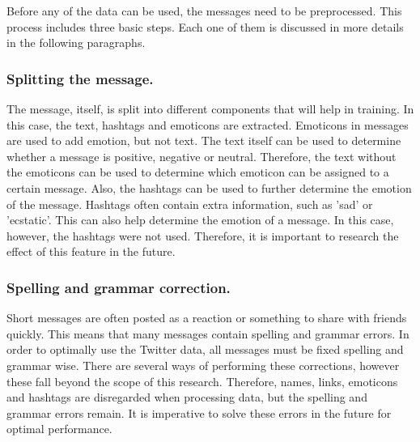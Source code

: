 
Before any of the data can be used, the messages need to be preprocessed. This process includes three basic steps. Each one of them is discussed in more details in the following paragraphs.

\subsubsection*{Splitting the message.}
The message, itself, is split into different components that will help in training. In this case, the text, hashtags and emoticons are extracted. Emoticons in messages are used to add emotion, but not text. The text itself can be used to determine whether a message is positive, negative or neutral. Therefore, the text without the emoticons can be used to determine which emoticon can be assigned to a certain message. Also, the hashtags can be used to further determine the emotion of the message. Hashtags often contain extra information, such as 'sad' or 'ecstatic'. This can also help determine the emotion of a message. In this case, however, the hashtags were not used. Therefore, it is important to research the effect of this feature in the future. 

\subsubsection*{Spelling and grammar correction.}
Short messages are often posted as a reaction or something to share with friends quickly. This means that many messages contain spelling and grammar errors. In order to optimally use the Twitter data, all messages must be fixed spelling and grammar wise. There are several ways of performing these corrections, however these fall beyond the scope of this research. Therefore, names, links, emoticons and hashtags are disregarded when processing data, but the spelling and grammar errors remain. It is imperative to solve these errors in the future for optimal performance.


